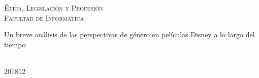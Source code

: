 \begin{center}
    \vspace{6mm}
    {\large \textsc{Ética, Legislación y Profesión}\\  %
    \textsc{Facultad de Informática}}\\ %
    \vspace{11mm}
    \begin{minipage}{12cm}
    \begin{center}
     Un breve análisis de las perspectivas de género en películas Disney a lo largo del tiempo   
    \end{center}
    
    \end{minipage}\\
    \vspace{9mm}
    {\large\textsc{201812}} %
    \vspace{12mm}
\end{center}
